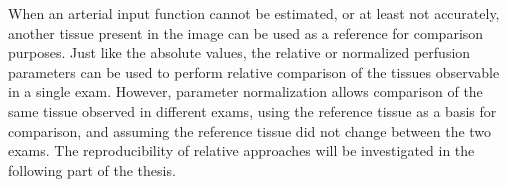 When an arterial input function cannot be estimated, or at least not accurately, another tissue present in the image can be used as a reference for comparison purposes.
Just like the absolute values, the relative or normalized perfusion parameters can be used to perform relative comparison of the tissues observable in a single exam. 
However, parameter normalization allows comparison of the same tissue observed in different exams, using the reference tissue as a basis for comparison, and assuming the reference tissue did not change between the two exams.
The reproducibility of relative approaches will be investigated in the following part of the thesis.

